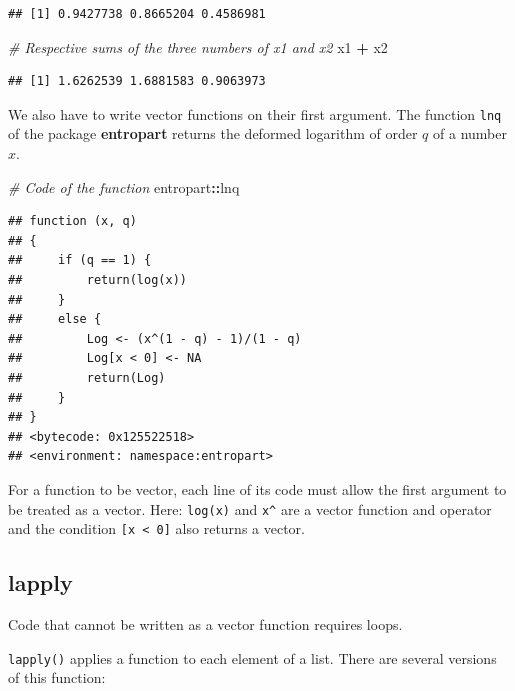 \documentclass[
  12pt,
  american,
  a4paper,
  extrafontsizes,onecolumn,openright
  ]{memoir}
\newenvironment{Shaded}{\begin{snugshade}}{\end{snugshade}}
\newcommand{\CommentTok}[1]{\textcolor[rgb]{0.56,0.35,0.01}{\textit{#1}}}
\newcommand{\NormalTok}[1]{#1}
\newcommand{\SpecialCharTok}[1]{\textcolor[rgb]{0.81,0.36,0.00}{\textbf{#1}}}
\begin{document}
\begin{verbatim}
## [1] 0.9427738 0.8665204 0.4586981
\end{verbatim}

\begin{Shaded}
\begin{Highlighting}[]
\CommentTok{\# Respective sums of the three numbers of x1 and x2}
\NormalTok{x1 }\SpecialCharTok{+}\NormalTok{ x2}
\end{Highlighting}
\end{Shaded}

\begin{verbatim}
## [1] 1.6262539 1.6881583 0.9063973
\end{verbatim}

\normalsize

We also have to write vector functions on their first argument.
The function \texttt{lnq} of the package \textbf{entropart} returns the deformed logarithm of order \(q\) of a number \(x\).

\scriptsize

\begin{Shaded}
\begin{Highlighting}[]
\CommentTok{\# Code of the function}
\NormalTok{entropart}\SpecialCharTok{::}\NormalTok{lnq}
\end{Highlighting}
\end{Shaded}

\begin{verbatim}
## function (x, q) 
## {
##     if (q == 1) {
##         return(log(x))
##     }
##     else {
##         Log <- (x^(1 - q) - 1)/(1 - q)
##         Log[x < 0] <- NA
##         return(Log)
##     }
## }
## <bytecode: 0x125522518>
## <environment: namespace:entropart>
\end{verbatim}

\normalsize

For a function to be vector, each line of its code must allow the first argument to be treated as a vector.
Here: \texttt{log(x)} and \texttt{x\^{}} are a vector function and operator and the condition \texttt{{[}x\ \textless{}\ 0{]}} also returns a vector.

\subsection{lapply}\label{lapply}

Code that cannot be written as a vector function requires loops.

\texttt{lapply()} applies a function to each element of a list.
There are several versions of this function:
\end{document}
